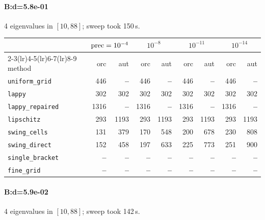 \paragraph{B:d=5.8e-01} 4 eigenvalues in $[10, 88]$; sweep took 150\,s.

\begin{center}
\small
\begin{tabular}{lrrrrrrrr}
\toprule
& \multicolumn{2}{c}{$\mathrm{prec}=10^{-4}$} & \multicolumn{2}{c}{$10^{-8}$} & \multicolumn{2}{c}{$10^{-11}$} & \multicolumn{2}{c}{$10^{-14}$} \\
\cmidrule(lr){2-3}\cmidrule(lr){4-5}\cmidrule(lr){6-7}\cmidrule(lr){8-9}
method & orc & aut & orc & aut & orc & aut & orc & aut \\
\midrule
\texttt{uniform\_grid} & 446 & \textbf{--} & 446 & \textbf{--} & 446 & \textbf{--} & 446 & \textbf{--} \\
\texttt{lappy} & 302 & 302 & 302 & 302 & 302 & 302 & 302 & 302 \\
\texttt{lappy\_repaired} & 1316 & \textbf{--} & 1316 & \textbf{--} & 1316 & \textbf{--} & 1316 & \textbf{--} \\
\texttt{lipschitz} & 293 & 1193 & 293 & 1193 & 293 & 1193 & 293 & 1193 \\
\texttt{swing\_cells} & 131 & 379 & 170 & 548 & 200 & 678 & 230 & 808 \\
\texttt{swing\_direct} & 152 & 458 & 197 & 633 & 225 & 773 & 251 & 900 \\
\midrule
\texttt{single\_bracket} & \textbf{--} & \textbf{--} & \textbf{--} & \textbf{--} & \textbf{--} & \textbf{--} & \textbf{--} & \textbf{--} \\
\texttt{fine\_grid} & \textbf{--} & \textbf{--} & \textbf{--} & \textbf{--} & \textbf{--} & \textbf{--} & \textbf{--} & \textbf{--} \\
\bottomrule
\end{tabular}
\end{center}

\paragraph{B:d=5.9e-02} 4 eigenvalues in $[10, 88]$; sweep took 142\,s.

